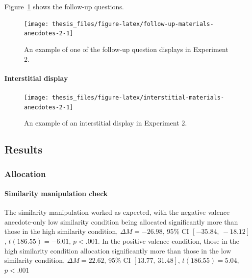 \documentclass[a4paper, nobind, dvipsnames]{templates/ociamthesis}
\theoremstyle{definition}
\theoremstyle{definition}
\theoremstyle{definition}
\theoremstyle{definition}
\theoremstyle{remark}
\begin{document}
Figure~\ref{fig:follow-up-materials-anecdotes-2} shows the follow-up questions.



\begin{figure}
\texttt{[image: thesis\_files/figure-latex/follow-up-materials-anecdotes-2-1]} \caption{An example of one of the follow-up question displays in Experiment 2.}\label{fig:follow-up-materials-anecdotes-2}
\end{figure}

\hypertarget{interstitial-materials-anecdotes-2}{%
\paragraph{Interstitial display}\label{interstitial-materials-anecdotes-2}}



\begin{figure}
\texttt{[image: thesis\_files/figure-latex/interstitial-materials-anecdotes-2-1]} \caption{An example of an interstitial display in Experiment 2.}\label{fig:interstitial-materials-anecdotes-2}
\end{figure}

\hypertarget{results-anecdotes-2-appendix}{%
\subsection{Results}\label{results-anecdotes-2-appendix}}

\hypertarget{allocation-3}{%
\subsubsection{Allocation}\label{allocation-3}}

\hypertarget{similarity-manipulation-check}{%
\paragraph{Similarity manipulation check}\label{similarity-manipulation-check}}

The similarity manipulation worked as expected, with the negative valence
anecdote-only low similarity condition being allocated significantly more than
those in the high similarity condition,
\(\Delta M = -26.98\), 95\% CI \([-35.84,~-18.12]\), \(t(186.55) = -6.01\), \(p < .001\). In the
positive valence condition, those in the high similarity condition allocation
significantly more than those in the low similarity condition,
\(\Delta M = 22.62\), 95\% CI \([13.77,~31.48]\), \(t(186.55) = 5.04\), \(p < .001\)
\end{document}
